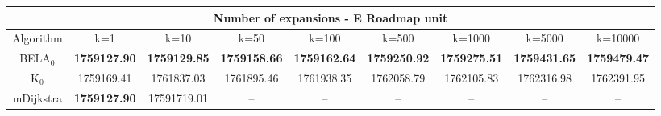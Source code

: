 \begin{tabular}{c|cccccccc}\toprule
\multicolumn{9}{c}{Number of expansions - E Roadmap unit}\\ \midrule
Algorithm & k=1 & k=10 & k=50 & k=100 & k=500 & k=1000 & k=5000 & k=10000 \\ \midrule
BELA$_0$ & \textbf{1759127.90} & \textbf{1759129.85} & \textbf{1759158.66} & \textbf{1759162.64} & \textbf{1759250.92} & \textbf{1759275.51} & \textbf{1759431.65} & \textbf{1759479.47} \\
K$_0$ & 1759169.41 & 1761837.03 & 1761895.46 & 1761938.35 & 1762058.79 & 1762105.83 & 1762316.98 & 1762391.95 \\
mDijkstra & \textbf{1759127.90} & 17591719.01 & -- & -- & -- & -- & -- & -- \\ \bottomrule 
\end{tabular}
